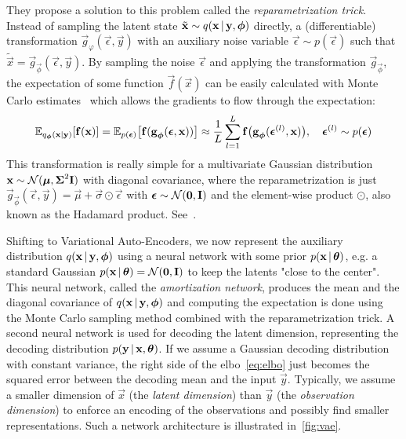 		They propose a solution to this problem called the \emph{reparametrization trick}. Instead of sampling the latent state \( \tilde{\boldsymbol{\mathrm{x}}} \sim q(\boldsymbol{\mathrm{x}} \,\vert\, \boldsymbol{\mathrm{y}}, \boldsymbol{\mathrm{\phi}}) \) directly, a (differentiable) transformation \( \vec{g}_{\varphi}(\vec{\epsilon}, \vec{y}) \) with an auxiliary noise variable \(\vec{\epsilon} \sim p(\vec{\epsilon})\) such that \( \tilde{\vec{x}} = \vec{g}_{\vec{\phi}}(\vec{\epsilon}, \vec{y}) \). By sampling the noise \(\vec{\epsilon}\) and applying the transformation \(\vec{g}_{\vec{\phi}}\), the expectation of some function \( \vec{f}(\vec{x}) \) can be easily calculated with Monte Carlo estimates~\cite{kingmaAutoEncodingVariationalBayes2014} which allows the gradients to flow through the expectation:
		\begin{align*}
			\mathbb{E}_{q_{\boldsymbol{\mathrm{\phi}}}(\boldsymbol{\mathrm{x}} \vert \boldsymbol{\mathrm{y}})} [\boldsymbol{\mathrm{f}}(\boldsymbol{\mathrm{x}})]
				= \mathbb{E}_{p(\boldsymbol{\mathrm{\epsilon}})}\big[ \boldsymbol{\mathrm{f}}(\boldsymbol{\mathrm{g}}_{\boldsymbol{\mathrm{\phi}}}(\boldsymbol{\mathrm{\epsilon}}, \boldsymbol{\mathrm{x}})) \big]
				\approx \frac{1}{L} \sum_{l = 1}^{L} \boldsymbol{\mathrm{f}}\big(\boldsymbol{\mathrm{g}}_{\boldsymbol{\mathrm{\phi}}}(\boldsymbol{\mathrm{\epsilon}}^{(l)}, \boldsymbol{\mathrm{x}})\big),\quad \boldsymbol{\mathrm{\epsilon}}^{(l)} \sim p(\boldsymbol{\mathrm{\epsilon}})
		\end{align*}
		This transformation is really simple for a multivariate Gaussian distribution \( \boldsymbol{\mathrm{x}} \sim \mathcal{N}(\boldsymbol{\mathrm{\mu}}, \boldsymbol{\mathrm{\Sigma}}^2 \boldsymbol{\mathrm{I}}) \) with diagonal covariance, where the reparametrization is just \( \vec{g}_{\vec{\phi}}(\vec{\epsilon}, \vec{y}) = \vec{\mu} + \vec{\sigma} \odot \vec{\epsilon} \) with \( \boldsymbol{\mathrm{\epsilon}} \sim \mathcal{N}(\boldsymbol{\mathrm{0}}, \boldsymbol{\mathrm{I}}) \) and the element-wise product \( \odot \), also known as the Hadamard product. See~\cite[5]{kingmaAutoEncodingVariationalBayes2014}.

		Shifting to Variational Auto-Encoders, we now represent the auxiliary distribution \( q(\boldsymbol{\mathrm{x}} \,\vert\, \boldsymbol{\mathrm{y}}, \boldsymbol{\mathrm{\phi}}) \) using a neural network with some prior \( p(\boldsymbol{\mathrm{x}} \,\vert\, \boldsymbol{\mathrm{\theta}}) \), e.g. a standard Gaussian \( p(\boldsymbol{\mathrm{x}} \,\vert\, \boldsymbol{\mathrm{\theta}}) = \mathcal{N}(\boldsymbol{\mathrm{0}}, \boldsymbol{\mathrm{I}}) \) to keep the latents "close to the center". This neural network, called the \emph{amortization network}, produces the mean and the diagonal covariance of \( q(\boldsymbol{\mathrm{x}} \,\vert\, \boldsymbol{\mathrm{y}}, \boldsymbol{\mathrm{\phi}}) \) and computing the expectation is done using the Monte Carlo sampling method combined with the reparametrization trick. A second neural network is used for decoding the latent dimension, representing the decoding distribution \( p(\boldsymbol{\mathrm{y}} \,\vert\, \boldsymbol{\mathrm{x}}, \boldsymbol{\mathrm{\theta}}) \). If we assume a Gaussian decoding distribution with constant variance, the right side of the \ac{elbo}~\eqref{eq:elbo} just becomes the squared error between the decoding mean and the input \(\vec{y}\). Typically, we assume a smaller dimension of \(\vec{x}\) (the \emph{latent dimension}) than \( \vec{y} \) (the \emph{observation dimension}) to enforce an encoding of the observations and possibly find smaller representations. Such a network architecture is illustrated in~\autoref{fig:vae}.

